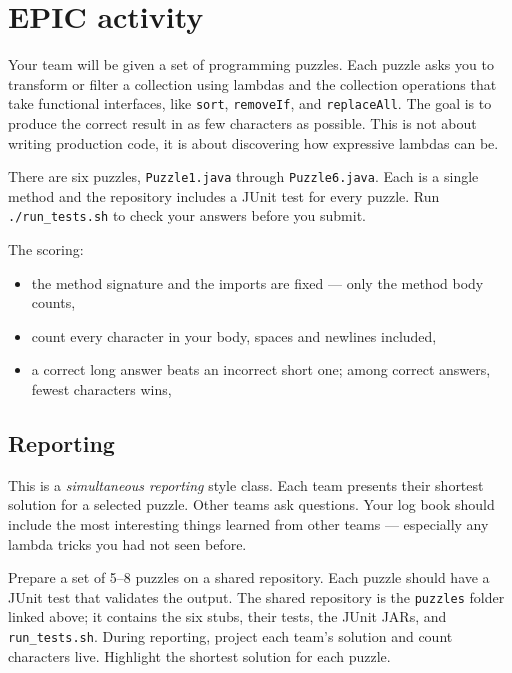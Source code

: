 \documentclass[twoside=false,DIV=14]{scrartcl}
\begin{document}
\section*{EPIC activity}

Your team will be given a set of programming puzzles.  Each puzzle asks you to transform or filter a collection using lambdas and the collection operations that take functional interfaces, like \texttt{sort}, \texttt{removeIf}, and \texttt{replaceAll}.  The goal is to produce the correct result in as few characters as possible.  This is not about writing production code, it is about discovering how expressive lambdas can be.

There are six puzzles, \texttt{Puzzle1.java} through \texttt{Puzzle6.java}.  Each is a single method and the repository includes a JUnit test for every puzzle.  Run \texttt{./run\_tests.sh} to check your answers before you submit.

The scoring:
\begin{itemize}
    \item the method signature and the imports are fixed --- only the method body counts,
    \item count every character in your body, spaces and newlines included,
    \item a correct long answer beats an incorrect short one; among correct answers, fewest characters wins,
\end{itemize}

\subsection*{Reporting}

This is a \emph{simultaneous reporting} style class.  Each team presents their shortest solution for a selected puzzle.  Other teams ask questions.  Your log book should include the most interesting things learned from other teams --- especially any lambda tricks you had not seen before.

\begin{teacher}
Prepare a set of 5--8 puzzles on a shared repository.  Each puzzle should have a JUnit test that validates the output.  The shared repository is the \texttt{puzzles} folder linked above; it contains the six stubs, their tests, the JUnit JARs, and \texttt{run\_tests.sh}.  During reporting, project each team's solution and count characters live.  Highlight the shortest solution for each puzzle.
\end{teacher}
\end{document}
